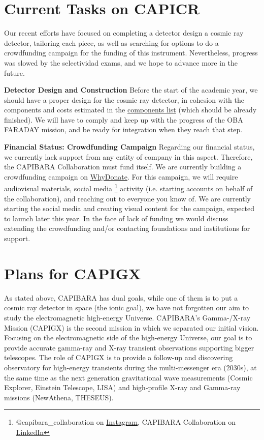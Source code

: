 \documentclass[arxiv,usenatbib]{iupartex}
\begin{document}
\section{Current Tasks on CAPICR}
Our recent efforts have focused on completing a detector design a cosmic ray detector, tailoring each piece, as well as searching for options to do a crowdfunding campaign for the funding of this instrument. Nevertheless, progress was slowed by the selectividad exams, and we hope to advance more in the future.

\textbf{Detector Design and Construction}\newline
Before the start of the academic year, we should have a proper design for the cosmic ray detector, in cohesion with the components and costs estimated in the \href{https://github.com/CAPIBARA3/capicr-detector-design/blob/main/Cosmic_Ray_Detector_Materials.md}{components list} (which should be already finished). We will have to comply and keep up with the progress of the OBA FARADAY mission, and be ready for integration when they reach that step.

\textbf{Financial Status: Crowdfunding Campaign}\newline
Regarding our financial status, we currently lack support from any entity of company in this aspect. Therefore, the CAPIBARA Collaboration must fund itself. We are currently building a crowdfunding campaign on \href{https://whydonate.com}{WhyDonate}. For this campaign, we will require audiovisual materials, social media \footnote{@capibara\_collaboration on \href{https://www.instagram.com/capibara_collaboration/}{Instagram}, CAPIBARA Collaboration on \href{https://www.linkedin.com/company/107744838/admin/dashboard/}{LinkedIn}} activity (i.e. starting accounts on behalf of the collaboration), and reaching out to everyone you know of. We are currently starting the social media and creating visual content for the campaign, expected to launch later this year. In the face of lack of funding we would discuss extending the crowdfunding and/or contacting foundations and institutions for support.

\section{Plans for CAPIGX}
As stated above, CAPIBARA has dual goals, while one of them is to put a cosmic ray detector in space (the ionic goal), we have not forgotten our aim to study the electromagnetic high-energy Universe. CAPIBARA's Gamma-/X-ray Mission (CAPIGX) is the second mission in which we separated our initial vision. Focusing on the electromagnetic side of the high-energy Universe, our goal is to provide accurate gamma-ray and X-ray transient observations supporting bigger telescopes. The role of CAPIGX is to provide a follow-up and discovering observatory for high-energy transients during the multi-messenger era (2030s), at the same time as the next generation gravitational wave measurements (Cosmic Explorer, Einstein Telescope, LISA) and high-profile X-ray and Gamma-ray missions (NewAthena, THESEUS).
\end{document}
